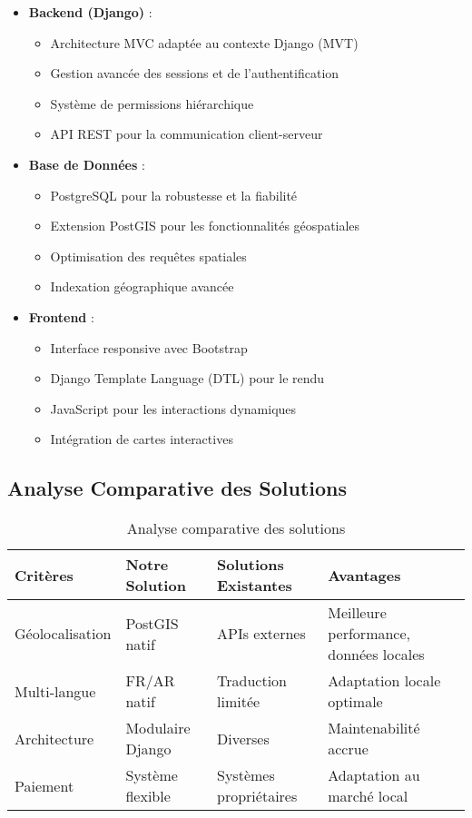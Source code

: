 \begin{itemize}
    \item \textbf{Backend (Django)} :
    \begin{itemize}
        \item Architecture MVC adaptée au contexte Django (MVT)
        \item Gestion avancée des sessions et de l'authentification
        \item Système de permissions hiérarchique
        \item API REST pour la communication client-serveur
    \end{itemize}
    
    \item \textbf{Base de Données} :
    \begin{itemize}
        \item PostgreSQL pour la robustesse et la fiabilité
        \item Extension PostGIS pour les fonctionnalités géospatiales
        \item Optimisation des requêtes spatiales
        \item Indexation géographique avancée
    \end{itemize}
    
    \item \textbf{Frontend} :
    \begin{itemize}
        \item Interface responsive avec Bootstrap
        \item Django Template Language (DTL) pour le rendu
        \item JavaScript pour les interactions dynamiques
        \item Intégration de cartes interactives
    \end{itemize}
\end{itemize}

\subsection{Analyse Comparative des Solutions}
\begin{table}[h]
\centering
\begin{tabular}{|p{3cm}|p{3cm}|p{3cm}|p{3cm}|}
\hline
\textbf{Critères} & \textbf{Notre Solution} & \textbf{Solutions Existantes} & \textbf{Avantages} \\
\hline
Géolocalisation & PostGIS natif & APIs externes & Meilleure performance, données locales \\
\hline
Multi-langue & FR/AR natif & Traduction limitée & Adaptation locale optimale \\
\hline
Architecture & Modulaire Django & Diverses & Maintenabilité accrue \\
\hline
Paiement & Système flexible & Systèmes propriétaires & Adaptation au marché local \\
\hline
\end{tabular}
\caption{Analyse comparative des solutions}
\label{tab:comparison}
\end{table}

